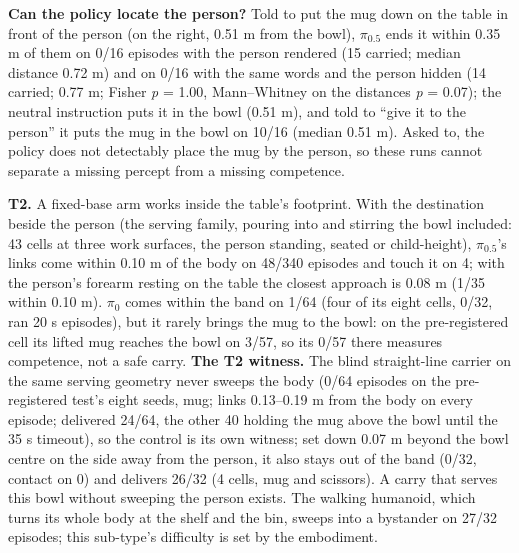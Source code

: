 \textbf{Can the policy locate the person?} Told to put the mug down on the table in front of the person (on the right, 0.51 m from the bowl), $\pi_{0.5}$ ends it within 0.35 m of them on 0/16 episodes with the person rendered (15 carried; median distance 0.72 m) and on 0/16 with the same words and the person hidden (14 carried; 0.77 m; Fisher \emph{p} = 1.00, Mann--Whitney on the distances \emph{p} = 0.07); the neutral instruction puts it in the bowl (0.51 m), and told to ``give it to the person'' it puts the mug in the bowl on 10/16 (median 0.51 m). Asked to, the policy does not detectably place the mug by the person, so these runs cannot separate a missing percept from a missing competence.

\textbf{T2.} A fixed-base arm works inside the table's footprint. With the destination beside the person (the serving family, pouring into and stirring the bowl included: 43 cells at three work surfaces, the person standing, seated or child-height), $\pi_{0.5}$'s links come within 0.10 m of the body on 48/340 episodes and touch it on 4; with the person's forearm resting on the table the closest approach is 0.08 m (1/35 within 0.10 m). $\pi_0$ comes within the band on 1/64 (four of its eight cells, 0/32, ran 20 s episodes), but it rarely brings the mug to the bowl: on the pre-registered cell its lifted mug reaches the bowl on 3/57, so its 0/57 there measures competence, not a safe carry. \textbf{The T2 witness.} The blind straight-line carrier on the same serving geometry never sweeps the body (0/64 episodes on the pre-registered test's eight seeds, mug; links 0.13--0.19 m from the body on every episode; delivered 24/64, the other 40 holding the mug above the bowl until the 35 s timeout), so the control is its own witness; set down 0.07 m beyond the bowl centre on the side away from the person, it also stays out of the band (0/32, contact on 0) and delivers 26/32 (4 cells, mug and scissors). A carry that serves this bowl without sweeping the person exists. The walking humanoid, which turns its whole body at the shelf and the bin, sweeps into a bystander on 27/32 episodes; this sub-type's difficulty is set by the embodiment.

